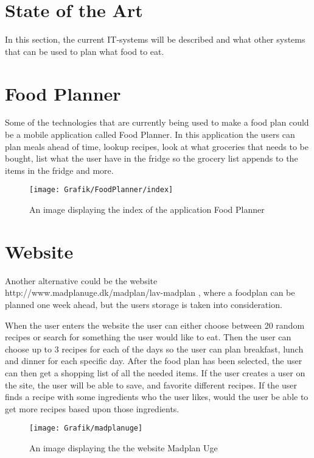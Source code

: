\section{State of the Art}
In this section, the current IT-systems will be described and what other systems that can be used to plan what food to eat.

\section{Food Planner}
Some of the technologies that are currently being used to make a food plan could be a mobile application called Food Planner.
In this application the users can plan meals ahead of time, lookup recipes, look at what groceries that needs to be bought,
list what the user have in the fridge so the grocery list appends to the items in the fridge and more.

\begin{figure}[H]
    \centering
    \texttt{[image: Grafik/FoodPlanner/index]}
    \caption{An image displaying the index of the application Food Planner}
    \label{FoodPlannerIndex}
\end{figure}


\section{Website}
Another alternative could be the website http://www.madplanuge.dk/madplan/lav-madplan 
, where a foodplan can be planned one week ahead, but the users storage is taken into consideration.

When the user enters the website the user can either choose between 20 random recipes or search for something the user would like to eat.
Then the user can choose up to 3 recipes for each of the days so the user can plan breakfast, lunch and dinner for each specific day.
After the food plan has been selected, the user can then get a shopping list of all the needed items.
If the user creates a user on the site, the user will be able to save, and favorite different recipes.
If the user finds a recipe with some ingredients who the user likes, would the user be able to get more recipes based upon those ingredients.

\begin{figure}[H]
    \centering
    \texttt{[image: Grafik/madplanuge]}
    \caption{An image displaying the the website Madplan Uge}
    \label{MadPlanUge}
\end{figure}